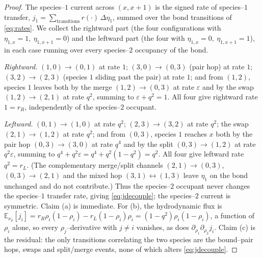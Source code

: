 \documentclass[11pt]{article}
\theoremstyle{plain}
\theoremstyle{definition}
\theoremstyle{remark}
\newcommand{\E}{\mathbb{E}}\newcommand{\PP}{\mathbb{P}}\newcommand{\dd}{\,\mathrm{d}}
\newcommand{\eps}{\varepsilon}\newcommand{\Exp}{\mathrm{Exp}}
\begin{document}
\begin{proof}
The species--$1$ current across $(x,x{+}1)$ is the signed rate of species--$1$
transfer, $j_1=\sum_{\text{transitions}}r(\cdot)\,\Delta\eta_{1}$, summed over the bond
transitions of \eqref{eq:rates}. We collect the rightward part (the four configurations
with $\eta_{1,x}=1,\ \eta_{1,x+1}=0$) and the leftward part (the four with
$\eta_{1,x}=0,\ \eta_{1,x+1}=1$), in each case running over every species--$2$
occupancy of the bond.

\emph{Rightward.} $(1,0)\!\to\!(0,1)$ at rate $1$; $(3,0)\!\to\!(0,3)$ (pair hop) at
rate $1$; $(3,2)\!\to\!(2,3)$ (species $1$ sliding past the pair) at rate $1$; and from
$(1,2)$, species $1$ leaves both by the merge $(1,2)\!\to\!(0,3)$ at rate $\eps$ and by
the swap $(1,2)\!\to\!(2,1)$ at rate $q^2$, summing to $\eps+q^2=1$. All four give
rightward rate $1=r_R$, independently of the species--$2$ occupant.

\emph{Leftward.} $(0,1)\!\to\!(1,0)$ at rate $q^2$; $(2,3)\!\to\!(3,2)$ at rate $q^2$;
the swap $(2,1)\!\to\!(1,2)$ at rate $q^2$; and from $(0,3)$, species $1$ reaches $x$
both by the pair hop $(0,3)\!\to\!(3,0)$ at rate $q^4$ and by the split
$(0,3)\!\to\!(1,2)$ at rate $q^2\eps$, summing to $q^4+q^2\eps=q^4+q^2(1-q^2)=q^2$. All
four give leftward rate $q^2=r_L$. (The complementary merge/split channels
$(2,1)\!\to\!(0,3)$, $(0,3)\!\to\!(2,1)$ and the mixed hop
$(3,1)\!\leftrightarrow\!(1,3)$ leave $\eta_1$ on the bond unchanged and do not
contribute.) Thus the species--$2$ occupant never changes the species--$1$ transfer
rate, giving \eqref{eq:jdecouple}; the species--$2$ current is symmetric. Claim (a) is immediate. For (b), the hydrodynamic
flux is $\E_{\nu_\rho}[j_i]=r_R\rho_i(1-\rho_i)-r_L(1-\rho_i)\rho_i=(1-q^2)\rho_i(1-\rho_i)$,
a function of $\rho_i$ alone, so every $\rho_j$--derivative with $j\ne i$ vanishes, as
does $\partial_{\rho_1}\partial_{\rho_2}j_i$. Claim (c) is the residual: the only
transitions correlating the two species are the bound--pair hops, swaps and
split/merge events, none of which alters \eqref{eq:jdecouple}.
\end{proof}
\end{document}
